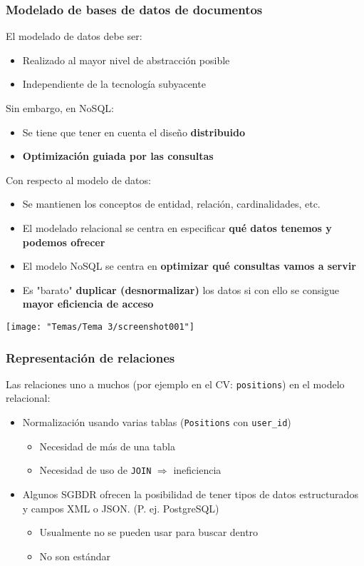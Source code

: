 \subsubsection{Modelado de bases de datos de documentos}
El modelado de datos debe ser:
\begin{itemize}
\item Realizado al mayor nivel de abstracción posible
\item Independiente de la tecnología subyacente
\end{itemize}
Sin embargo, en NoSQL:
\begin{itemize}
\item  Se tiene que tener en cuenta el diseño \textbf{distribuido}
\item \textbf{Optimización guiada por las consultas}
\end{itemize}
Con respecto al modelo de datos:
\begin{itemize}
\item Se mantienen los conceptos de entidad, relación, cardinalidades, etc.
\item El modelado relacional se centra en especificar \textbf{qué datos tenemos y podemos ofrecer}
\item El modelo NoSQL se centra en \textbf{optimizar qué consultas vamos a servir}
\item Es "barato" \textbf{duplicar (desnormalizar)} los datos si con ello se consigue \textbf{mayor eficiencia de acceso}
\end{itemize}
\begin{center}
	\texttt{[image: "Temas/Tema 3/screenshot001"]}
\end{center}
\subsubsection{Representación de relaciones}
Las relaciones uno a muchos (por ejemplo en el CV: \texttt{positions}) en el modelo relacional:
\begin{itemize}
	\item Normalización usando varias tablas (\texttt{Positions} con \texttt{user_id})
\begin{itemize}
	\item Necesidad de más de una tabla
\item Necesidad de uso de \texttt{JOIN} $\Rightarrow$ ineficiencia
\end{itemize}
\item Algunos SGBDR ofrecen la posibilidad de tener tipos de datos estructurados y campos XML o JSON. (P. ej. PostgreSQL)
\begin{itemize}
	\item Usualmente no se pueden usar para buscar dentro
\item No son estándar
\end{itemize}
\end{itemize}
